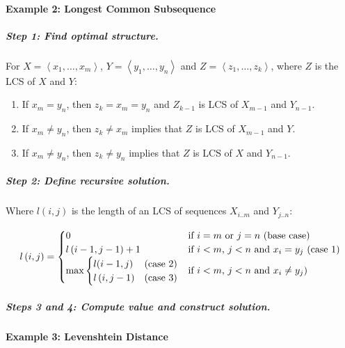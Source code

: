 \documentclass[twocolumn,english]{article}
\numberwithin{equation}{section}
\numberwithin{figure}{section}
\numberwithin{table}{section}
\begin{document}
\paragraph{Example 2: Longest Common Subsequence}


\subparagraph{Step 1: Find optimal structure.}

For $X=\left\langle x_{1},\dots,x_{m}\right\rangle $, $Y=\left\langle y_{1},\dots,y_{n}\right\rangle $
and $Z=\left\langle z_{1},\dots,z_{k}\right\rangle $, where $Z$
is the LCS of $X$ and $Y$: 
\begin{enumerate}
\item If $x_{m}=y_{n}$, then $z_{k}=x_{m}=y_{n}$ and $Z_{k-1}$ is LCS
of $X_{m-1}$ and $Y_{n-1}$. 
\item If $x_{m}\neq y_{n}$, then $z_{k}\neq x_{m}$ implies that $Z$ is
LCS of $X_{m-1}$ and $Y$. 
\item If $x_{m}\neq y_{n}$, then $z_{k}\neq y_{n}$ implies that $Z$ is
LCS of $X$ and $Y_{n-1}$. 
\end{enumerate}

\subparagraph{Step 2: Define recursive solution.}

Where $l\left(i,j\right)$ is the length of an LCS of sequences $X_{i..m}$
and $Y_{j..n}$:

\[
l\left(i,j\right)=\begin{cases}
0 & \text{if \ensuremath{i=m} or \ensuremath{j=n} (base case)}\\
l\left(i-1,j-1\right)+1 & \text{if \ensuremath{i<m}, \ensuremath{j<n} and \ensuremath{x_{i}=y_{j}} (case 1)}\\
\max\begin{cases}
l(i-1,j) & \text{(case 2)}\\
l\left(i,j-1\right) & \text{(case 3)}
\end{cases} & \text{if \ensuremath{i<m}, \ensuremath{j<n} and \ensuremath{x_{i}\neq y_{j}})}
\end{cases}
\]



\subparagraph{Steps 3 and 4: Compute value and construct solution.}


\paragraph{Example 3: Levenshtein Distance}
\end{document}
